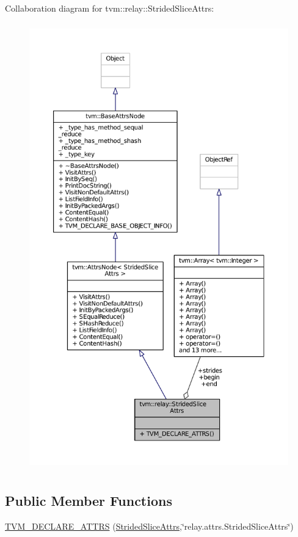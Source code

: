 Collaboration diagram for tvm\+:\+:relay\+:\+:Strided\+Slice\+Attrs\+:
\nopagebreak
\begin{figure}[H]
\begin{center}
\leavevmode
\includegraphics[height=550pt]{structtvm_1_1relay_1_1StridedSliceAttrs__coll__graph}
\end{center}
\end{figure}
\subsection*{Public Member Functions}
\begin{DoxyCompactItemize}
\item 
\hyperlink{structtvm_1_1relay_1_1StridedSliceAttrs_ad71dfaf2cb9b1afad1757681aa51b412}{T\+V\+M\+\_\+\+D\+E\+C\+L\+A\+R\+E\+\_\+\+A\+T\+T\+RS} (\hyperlink{structtvm_1_1relay_1_1StridedSliceAttrs}{Strided\+Slice\+Attrs},\char`\"{}relay.\+attrs.\+Strided\+Slice\+Attrs\char`\"{})
\end{DoxyCompactItemize}
